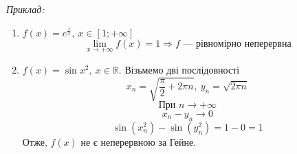 \documentclass[12pt]{report}
\begin{document}
\vspace{3mm}

\textit{Приклад:}

\begin{enumerate}
	\item $f(x) = e^{\frac{1}{x}},\ x \in [1; +\infty]$
		$$ \lim\limits_{x \to +\infty} f(x) = 1 \Longrightarrow f \textrm{ --- рівномірно неперервна}$$
	\item $f(x) = \sin x^2,\ x \in \mathbb{R}$. Візьмемо дві послідовності 
		$$x_n = \sqrt{ \frac{\pi}{2} + 2 \pi n},\ y_n = \sqrt{2 \pi n}$$
		$$\textrm{При } n \to +\infty$$
		$$x_n - y_n \to 0$$
		$$\sin (x_n^2) - \sin (y_n^2) = 1 - 0 = 1$$
		Отже, $f(x)$ не є неперервною за Гейне.
		
\end{enumerate}
\end{document}
